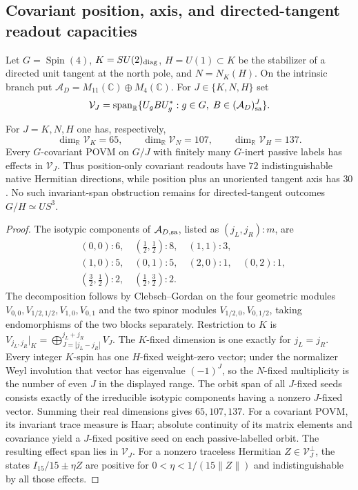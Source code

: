 \documentclass[12pt,a4paper]{article}
\begin{document}
\subsection{Covariant position, axis, and directed-tangent readout capacities}
\label{p2c:sec:covariant-direction-capacity}
Let $G=\operatorname{Spin}(4)$, $K=SU(2)_{\rm diag}$, $H=U(1)\subset K$
be the stabilizer of a directed unit tangent at the north pole, and
$N=N_K(H)$. On the intrinsic branch put
$\mathcal A_D=M_{11}(\mathbb C)\oplus M_4(\mathbb C)$.
For $J\in\{K,N,H\}$ set
\[
 \mathcal V_J=\operatorname{span}_{\mathbb R}
 \{U_gBU_g^*:g\in G,\;B\in(\mathcal A_D)_{\rm sa}^{J}\}.
\]
\begin{theorem}
\label{p2c:thm:covariant-stabilizer-capacity}
For $J=K,N,H$ one has, respectively,
\[
 \boxed{\dim_{\mathbb R}\mathcal V_K=65,\qquad
 \dim_{\mathbb R}\mathcal V_N=107,\qquad
 \dim_{\mathbb R}\mathcal V_H=137.}
\]
Every $G$-covariant POVM on $G/J$ with finitely many $G$-inert passive
labels has effects in $\mathcal V_J$. Thus position-only covariant
readouts have $72$ indistinguishable native Hermitian directions, while
position plus an unoriented tangent axis has $30$. No such invariant-span
obstruction remains for directed-tangent outcomes $G/H\simeq US^3$.
\end{theorem}
\begin{proof}
The isotypic components of $\mathcal A_{D,\rm sa}$, listed as
$(j_L,j_R):m$, are
\[
\begin{aligned}
 &(0,0):6,\quad (\tfrac12,\tfrac12):8,\quad (1,1):3,\\
 &(1,0):5,\quad(0,1):5,\quad(2,0):1,\quad(0,2):1,\\
 &(\tfrac32,\tfrac12):2,\quad(\tfrac12,\tfrac32):2.
\end{aligned}
\]
The decomposition follows by Clebsch--Gordan on the four geometric
modules $V_{0,0},V_{1/2,1/2},V_{1,0},V_{0,1}$ and the two spinor modules
$V_{1/2,0},V_{0,1/2}$, taking endomorphisms of the two blocks separately.
Restriction to $K$ is $V_{j_L,j_R}|_K=\bigoplus_{J=|j_L-j_R|}^{j_L+j_R}V_J$.
The $K$-fixed dimension is one exactly for $j_L=j_R$.
Every integer $K$-spin has one $H$-fixed weight-zero vector; under the
normalizer Weyl involution that vector has eigenvalue $(-1)^J$, so the
$N$-fixed multiplicity is the number of even $J$ in the displayed range.
The orbit span of all $J$-fixed seeds consists exactly of the irreducible
isotypic components having a nonzero $J$-fixed vector. Summing their
real dimensions gives $65,107,137$. For a covariant POVM, its invariant
trace measure is Haar; absolute continuity of its matrix elements and
covariance yield a $J$-fixed positive seed on each passive-labelled orbit.
The resulting effect span lies in $\mathcal V_J$. For a nonzero
traceless Hermitian $Z\in\mathcal V_J^\perp$, the states
$I_{15}/15\pm\eta Z$ are positive for
$0<\eta<1/(15\|Z\|)$ and indistinguishable by all those effects.
\end{proof}
\end{document}
